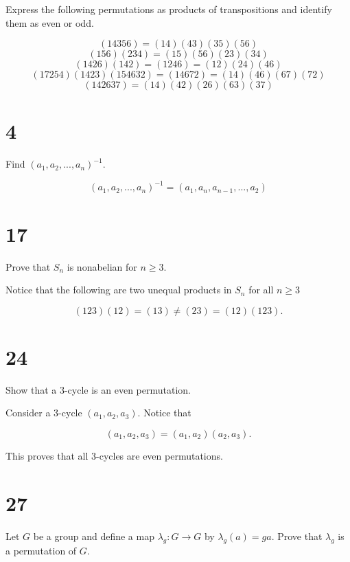 \documentclass[a4paper]{article}
\begin{document}
Express the following permutations as products of transpositions and identify them as even or odd.

$$(14356) = (14)(43)(35)(56)$$
$$(156)(234) = (15)(56)(23)(34)$$
$$(1426)(142) = (1246) = (12)(24)(46)$$
$$(17254)(1423)(154632) = (14672) = (14)(46)(67)(72)$$
$$(142637) = (14)(42)(26)(63)(37)$$



\section*{4}

Find $(a_1, a_2, ..., a_n)^{-1}$.

$$(a_1, a_2, ..., a_n)^{-1} = (a_1, a_n, a_{n-1}, ..., a_2)$$


\section*{17}

Prove that $S_n$ is nonabelian for $n \geq 3$.

\vspace{\baselineskip}

Notice that the following are two unequal products in $S_n$ for all $n \geq 3$ 

$$(123)(12) = (13) \neq (23) = (12)(123).$$



\section*{24}

Show that a 3-cycle is an even permutation.

\vspace{\baselineskip}

Consider a 3-cycle $(a_1, a_2, a_3)$. Notice that 

$$(a_1, a_2, a_3) = (a_1, a_2)(a_2, a_3).$$

This proves that all 3-cycles are even permutations.


\section*{27}

Let $G$ be a group and define a map $\lambda_g : G \rightarrow G$ by $\lambda_g(a) = ga$. Prove that $\lambda_g$ is a permutation of $G$.

\vspace{\baselineskip}
\end{document}
